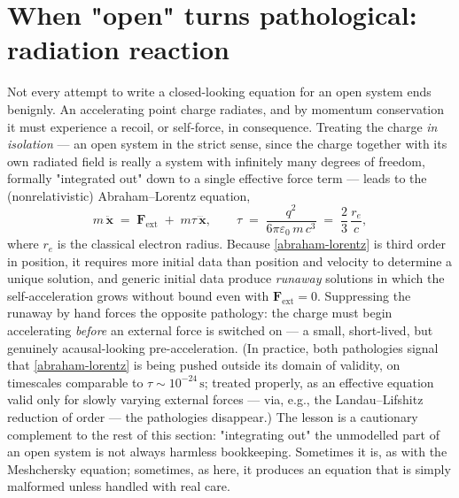 \section{When "open" turns pathological: radiation reaction}

Not every attempt to write a closed-looking equation for an open
system ends benignly. An accelerating point charge radiates, and by
momentum conservation it must experience a recoil, or self-force, in
consequence. Treating the charge \emph{in isolation} --- an open
system in the strict sense, since the charge together with its own
radiated field is really a system with infinitely many degrees of
freedom, formally "integrated out" down to a single effective force
term --- leads to the (nonrelativistic) Abraham--Lorentz equation,
\begin{equation}
  m\,\ddot{\mathbf x} \;=\; \mathbf F_{\mathrm{ext}} \;+\;
  m\tau\,\dddot{\mathbf x} ,
  \qquad
  \tau \;=\; \frac{q^2}{6\pi\varepsilon_0\,m\,c^3}
  \;=\; \frac{2}{3}\,\frac{r_e}{c},
  \label{abraham-lorentz}
\end{equation}
where $r_e$ is the classical electron radius. Because
\eqref{abraham-lorentz} is third order in position, it requires
more initial data than position and velocity to determine a unique
solution, and generic initial data produce \emph{runaway} solutions
in which the self-acceleration grows without bound even with
$\mathbf F_{\mathrm{ext}}=0$. Suppressing the runaway by hand forces
the opposite pathology: the charge must begin accelerating
\emph{before} an external force is switched on --- a small, short-lived,
but genuinely acausal-looking pre-acceleration. (In practice, both
pathologies signal that \eqref{abraham-lorentz} is being pushed
outside its domain of validity, on timescales comparable to $\tau
\sim 10^{-24}\,\mathrm s$; treated properly, as an effective equation
valid only for slowly varying external forces --- via, e.g., the
Landau--Lifshitz reduction of order --- the pathologies disappear.)
The lesson is a cautionary complement to the rest of this section:
"integrating out" the unmodelled part of an open system is not
always harmless bookkeeping. Sometimes it is, as with the Meshchersky
equation; sometimes, as here, it produces an equation that is simply
malformed unless handled with real care.

